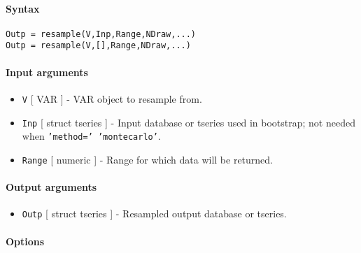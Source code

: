 


	\paragraph{Syntax}

\begin{verbatim}
Outp = resample(V,Inp,Range,NDraw,...)
Outp = resample(V,[],Range,NDraw,...)
\end{verbatim}

\paragraph{Input arguments}

\begin{itemize}
\item
  \texttt{V} {[} VAR {]} - VAR object to resample from.
\item
  \texttt{Inp} {[} struct \textbar{} tseries {]} - Input database or
  tseries used in bootstrap; not needed when
  \texttt{'method=' 'montecarlo'}.
\item
  \texttt{Range} {[} numeric {]} - Range for which data will be
  returned.
\end{itemize}

\paragraph{Output arguments}

\begin{itemize}
\itemsep1pt\parskip0pt
\item
  \texttt{Outp} {[} struct \textbar{} tseries {]} - Resampled output
  database or tseries.
\end{itemize}

\paragraph{Options}

